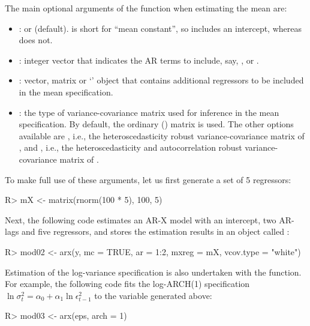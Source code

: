 \documentclass[article,nojss]{jss}
\begin{document}
The main optional arguments of the  function when estimating the mean are:
%
\begin{itemize}
\item {}:  or  (default).  is
  short for ``mean constant'', so  includes an
  intercept, whereas  does not.
	
\item {}: integer vector that indicates the AR terms to
  include, say, ,  or .
	
\item {}: vector, matrix or `' object that contains
  additional regressors to be included in the mean specification.
	
\item {}: the type of variance-covariance matrix used
  for inference in the mean specification. By default, the ordinary
  () matrix is used. The other options available are
  , i.e., the heteroscedasticity robust
  variance-covariance matrix of \cite{White80}, and
  , i.e., the heteroscedasticity and
  autocorrelation robust variance-covariance matrix of
  \cite{Neweyetal87}.
\end{itemize}
%
To make full use of these arguments, let us first generate a set of 5 regressors:
%
\begin{CodeChunk}
\begin{CodeInput}
R> mX <- matrix(rnorm(100 * 5), 100, 5)
\end{CodeInput}
\end{CodeChunk}
%
Next, the following code estimates an AR-X model with an intercept, two AR-lags and five regressors, and stores the estimation results in an object called :
%
\begin{CodeChunk}
\begin{CodeInput}
R> mod02 <- arx(y, mc = TRUE, ar = 1:2, mxreg = mX, vcov.type = "white")
\end{CodeInput}
\end{CodeChunk}
%
Estimation of the log-variance specification is also undertaken with the  function. For example, the following code fits the log-ARCH(1) specification $\ln\sigma_t^2 = \alpha_0 + \alpha_1 \ln\epsilon_{t-1}^2$ to the variable  generated above:
%
\begin{CodeChunk}
\begin{CodeInput}
R> mod03 <- arx(eps, arch = 1)
\end{CodeInput}
\end{CodeChunk}
\end{document}
